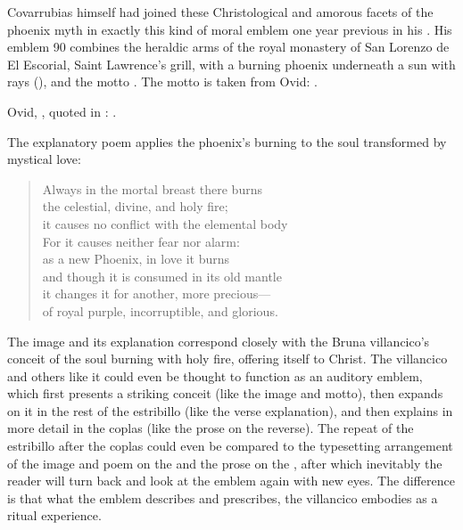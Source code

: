 Covarrubias himself had joined these Christological and amorous facets of the
phoenix myth in exactly this kind of moral emblem one year previous in his
.
His emblem 90 combines the heraldic arms of the royal monastery of San Lorenzo
de El Escorial, Saint Lawrence's grill, with a burning phoenix underneath a sun
with rays (), and the motto .%
    \Autocite[]{Covarrubias:Emblemas}
The motto is taken from Ovid: .%
\begin{Footnote}
    Ovid, , quoted in
    \autocite[290v]{Covarrubias:Emblemas}: .
\end{Footnote}
The explanatory poem applies the phoenix's burning to the soul transformed by
mystical love:
\begin{quoting}
\begin{verse}
Always in the mortal breast there burns\\
the celestial, divine, and holy fire;\\ 
it causes no conflict with the elemental body\\
For it causes neither fear nor alarm:\\
as a new Phoenix, in love it burns\\
and though it is consumed in its old mantle\\
it changes it for another, more precious---\\
of royal purple, incorruptible, and glorious.
\end{verse}
\end{quoting}
The image and its explanation correspond closely with the Bruna villancico's
conceit of the soul burning with holy fire, offering itself to Christ.
The villancico and others like it could even be thought to function as an
auditory emblem, which first presents a striking conceit (like the image and
motto), then expands on it in the rest of the estribillo (like the verse
explanation), and then explains in more detail in the coplas (like the prose on
the reverse).
The repeat of the estribillo after the coplas could even be compared to the
typesetting arrangement of the image and poem on the  and the prose
on the , after which inevitably the reader will turn back and look
at the emblem again with new eyes.
The difference is that what the emblem describes and prescribes, the villancico
embodies as a ritual experience.

